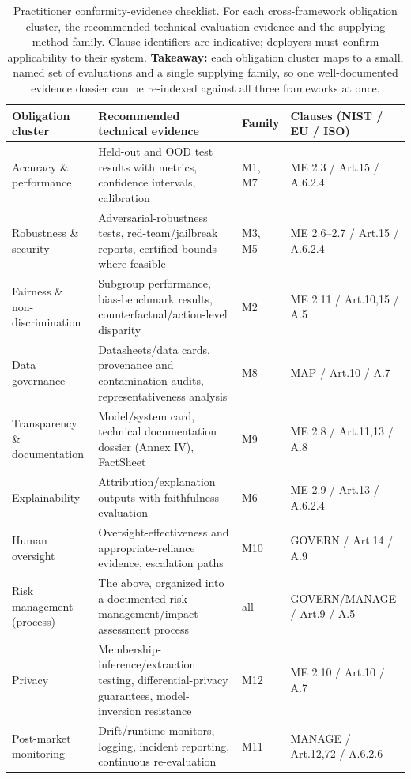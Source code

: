 \begin{table}[!tp]
\centering
\caption{Practitioner conformity-evidence checklist. For each cross-framework obligation
cluster, the recommended technical evaluation evidence and the supplying method family.
Clause identifiers are indicative; deployers must confirm applicability to their system. \textbf{Takeaway:} each obligation cluster maps to a small, named set of evaluations and a single supplying family, so one well-documented evidence dossier can be re-indexed against all three frameworks at once.}
\label{tab:checklist}
\footnotesize
\begin{tabular}{p{}p{}p{}p{}}
\toprule
Obligation cluster & Recommended technical evidence & Family & Clauses (NIST / EU / ISO)\\
\midrule
Accuracy \& performance & Held-out and OOD test results with metrics, confidence intervals, calibration & M1, M7 & ME 2.3 / Art.15 / A.6.2.4\\
Robustness \& security & Adversarial-robustness tests, red-team/jailbreak reports, certified bounds where feasible & M3, M5 & ME 2.6--2.7 / Art.15 / A.6.2.4\\
Fairness \& non-discrimination & Subgroup performance, bias-benchmark results, counterfactual/action-level disparity & M2 & ME 2.11 / Art.10,15 / A.5\\
Data governance & Datasheets/data cards, provenance and contamination audits, representativeness analysis & M8 & MAP / Art.10 / A.7\\
Transparency \& documentation & Model/system card, technical documentation dossier (Annex IV), FactSheet & M9 & ME 2.8 / Art.11,13 / A.8\\
Explainability & Attribution/explanation outputs with faithfulness evaluation & M6 & ME 2.9 / Art.13 / A.6.2.4\\
Human oversight & Oversight-effectiveness and appropriate-reliance evidence, escalation paths & M10 & GOVERN / Art.14 / A.9\\
Risk management (process) & The above, organized into a documented risk-management/impact-assessment process & all & GOVERN/MANAGE / Art.9 / A.5\\
Privacy & Membership-inference/extraction testing, differential-privacy guarantees, model-inversion resistance & M12 & ME 2.10 / Art.10 / A.7\\
Post-market monitoring & Drift/runtime monitors, logging, incident reporting, continuous re-evaluation & M11 & MANAGE / Art.12,72 / A.6.2.6\\
\bottomrule
\end{tabular}
\end{table}
